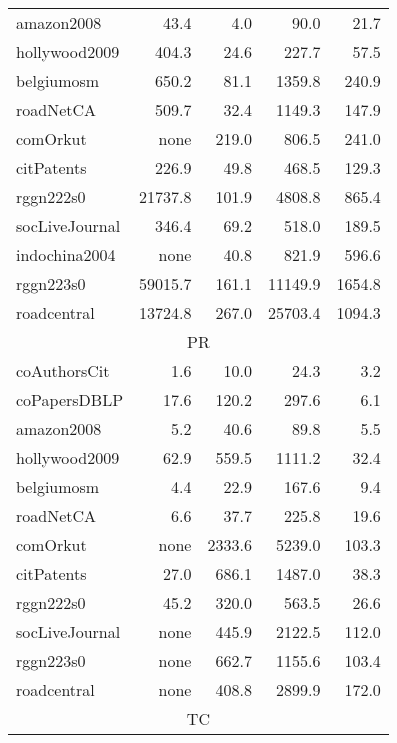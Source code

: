 \begin{table}[tbp]
\begin{center}
\begin{tabular}{|l|r|r|r|r|}
        \rowcolor{black!10} amazon2008&43.4&4.0&90.0&21.7\\
        \rowcolor{black!2 } hollywood2009&404.3&24.6&227.7&57.5\\
        \rowcolor{black!10} belgiumosm&650.2&81.1&1359.8&240.9\\
        \rowcolor{black!2 } roadNetCA&509.7&32.4&1149.3&147.9\\
        \rowcolor{black!10} comOrkut& none&219.0&806.5&241.0\\
        \rowcolor{black!2 } citPatents&226.9&49.8&468.5&129.3\\
        \rowcolor{black!10} rggn222s0&21737.8&101.9&4808.8&865.4\\
        \rowcolor{black!2 } socLiveJournal&346.4&69.2&518.0&189.5\\
        \rowcolor{black!10} indochina2004& none&40.8&821.9&596.6\\
        \rowcolor{black!2 } rggn223s0&59015.7&161.1&11149.9&1654.8\\
        \rowcolor{black!10} roadcentral&13724.8&267.0&25703.4&1094.3\\
        \hline
        \hline
        \multicolumn{5}{|c|}{PR} \\
        \hline
        \rowcolor{black!10} coAuthorsCit&1.6&10.0&24.3&3.2\\
        \rowcolor{black!2 } coPapersDBLP&17.6&120.2&297.6&6.1\\
        \rowcolor{black!10} amazon2008&5.2&40.6&89.8&5.5\\
        \rowcolor{black!2 } hollywood2009&62.9&559.5&1111.2&32.4\\
        \rowcolor{black!10} belgiumosm&4.4&22.9&167.6&9.4\\
        \rowcolor{black!2 } roadNetCA&6.6&37.7&225.8&19.6\\
        \rowcolor{black!10} comOrkut& none&2333.6&5239.0&103.3\\
        \rowcolor{black!2 } citPatents&27.0&686.1&1487.0&38.3\\
        \rowcolor{black!10} rggn222s0&45.2&320.0&563.5&26.6\\
        \rowcolor{black!2 } socLiveJournal& none&445.9&2122.5&112.0\\
        \rowcolor{black!10} rggn223s0& none&662.7&1155.6&103.4\\
        \rowcolor{black!2 } roadcentral& none&408.8&2899.9&172.0\\
        \hline
        \hline
        \multicolumn{5}{|c|}{TC} \\

\end{tabular}
\end{center}
\end{table}
